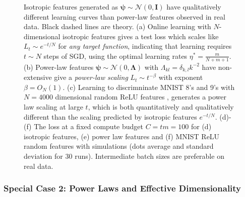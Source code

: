 \documentclass{article} %
\def\I{\mathbf I}
\begin{document}
\begin{figure}[t]
    \caption{ Isotropic features generated as $\bm\psi \sim \mathcal{N}(0,\I)$ have qualitatively different learning curves than power-law features observed in real data. Black dashed lines are theory. (a) Online learning with $N$-dimensional isotropic features gives a test loss which scales like $L_t \sim e^{-t/N}$ for \textit{any target function}, indicating that learning requires $t \sim N$ steps of SGD, using the optimal learning rates $\eta^* = \frac{m}{N+m+1}$. (b) Power-law features $\bm\psi \sim \mathcal{N}(0,\bm\Lambda)$ with $\Lambda_{kl} = \delta_{k,l} k^{-2}$ have non-extensive give a \textit{power-law scaling} $L_t \sim t^{-\beta}$ with exponent $\beta = O_N(1)$. (c) Learning to discrimninate MNIST 8's and 9's with $N=4000$ dimensional random ReLU features \citep{Rahimi_Recht}, generates a power law scaling at large $t$, which is both quantitatively and qualitatively different than the scaling predicted by isotropic features $e^{-t/N}$. (d)-(f) The loss at a fixed compute budget $C = tm = 100$ for (d) isotropic features, (e) power law features and (f) MNIST ReLU random features with simulations (dots average and standard deviation for $30$ runs).  Intermediate batch sizes are preferable on real data. }
    \label{fig:isotropic}
\end{figure}

\subsubsection{Special Case 2: Power Laws and Effective Dimensionality}\label{powerlaw_subsec}
\end{document}
